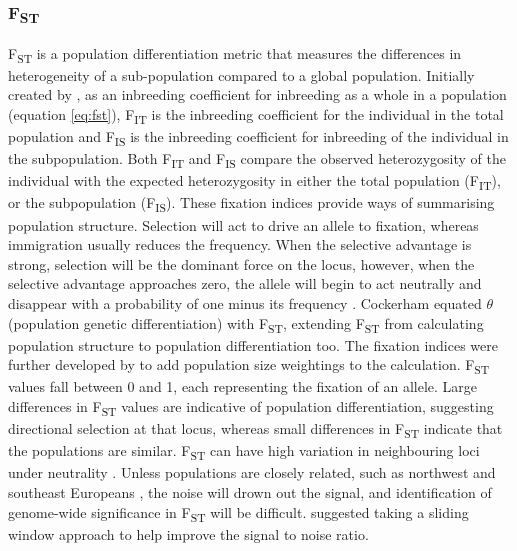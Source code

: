 \documentclass[]{report}
\begin{document}
\subsubsection{\texorpdfstring{F\textsubscript{ST}}{FST}}\label{fst}

F\textsubscript{ST} is a population differentiation metric that measures
the differences in heterogeneity of a sub-population compared to a
global population. Initially created by \citet{Wright1951}, as an
inbreeding coefficient for inbreeding as a whole in a population
(equation \eqref{eq:fst}), F\textsubscript{IT} is the inbreeding
coefficient for the individual in the total population and
F\textsubscript{IS} is the inbreeding coefficient for inbreeding of the
individual in the subpopulation. Both F\textsubscript{IT} and
F\textsubscript{IS} compare the observed heterozygosity of the
individual with the expected heterozygosity in either the total
population (F\textsubscript{IT}), or the subpopulation
(F\textsubscript{IS}). These fixation indices provide ways of
summarising population structure. Selection will act to drive an allele
to fixation, whereas immigration usually reduces the frequency. When the
selective advantage is strong, selection will be the dominant force on
the locus, however, when the selective advantage approaches zero, the
allele will begin to act neutrally and disappear with a probability of
one minus its frequency \citep{kimura_genetic_1968}. Cockerham
\citetext{\citeyear{Cockerham1969}; \citeyear{Cockerham1973}} equated
\(\theta\) (population genetic differentiation) with
F\textsubscript{ST}, extending F\textsubscript{ST} from calculating
population structure to population differentiation too. The fixation
indices were further developed by \citet{Weir1984} to add population
size weightings to the calculation. F\textsubscript{ST} values fall
between 0 and 1, each representing the fixation of an allele. Large
differences in F\textsubscript{ST} values are indicative of population
differentiation, suggesting directional selection at that locus, whereas
small differences in F\textsubscript{ST} indicate that the populations
are similar. F\textsubscript{ST} can have high variation in neighbouring
loci under neutrality \citep{Weir2005}. Unless populations are closely
related, such as northwest and southeast Europeans \citep{Price2008a},
the noise will drown out the signal, and identification of genome-wide
significance in F\textsubscript{ST} will be difficult. \citet{Weir2005}
suggested taking a sliding window approach to help improve the signal to
noise ratio.
\end{document}
